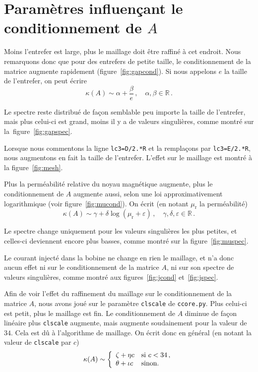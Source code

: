 \documentclass[11pt]{article}
\begin{document}
\section{Paramètres influençant le conditionnement de $A$}
\label{param}
Moins l'entrefer est large, plus le maillage doit être raffiné à cet endroit.
Nous remarquons donc que pour des entrefers de petite taille,
le conditionnement de la matrice augmente rapidement (figure~\ref{fig:gapcond}).
Si nous appelons $e$ la taille de l'entrefer, on peut écrire
\[
\kappa(A) \sim \alpha + \frac{\beta}{e}\,, \quad \alpha, \beta \in \mathbb{R}\,.
\]

Le spectre reste distribué de façon semblable peu importe la taille de l'entrefer,
mais plus celui-ci est grand, moins il y a de valeurs singulières, comme montré sur la figure~\ref{fig:gapspec}.

Lorsque nous commentons la ligne \texttt{lc3=D/2.*R} et la remplaçons par \texttt{lc3=E/2.*R}, nous augmentons en fait la taille de l'entrefer.
L'effet sur le maillage est montré à la figure~\ref{fig:mesh}.

Plus la perméabilité relative du noyau magnétique augmente,
plus le conditionnement de $A$ augmente aussi, selon une loi approximativement logarithmique (voir figure~\ref{fig:mucond}). On écrit (en notant $\mu_{\mathrm{r}}$ la perméabilité)
\[
\kappa(A) \sim \gamma + \delta \log(\mu_{\mathrm{r}} + \varepsilon)\,, \quad \gamma, \delta, \varepsilon \in \mathbb{R}\,. 
\]

Le spectre change uniquement pour les valeurs singulières les plus petites,
et celles-ci deviennent encore plus basses, comme montré sur la figure~\ref{fig:muspec}.

Le courant injecté dans la bobine ne change en rien le maillage,
et n'a donc aucun effet ni sur le conditionnement de la matrice $A$,
ni sur son spectre de valeurs singulières,
comme montré aux figures~\ref{fig:jcond} et~\ref{fig:jspec}.

Afin de voir l'effet du raffinement du maillage sur le conditionnement de la matrice $A$, nous avons joué sur le paramètre \texttt{clscale} de \texttt{ccore.py}.
Plus celui-ci est petit, plus le maillage est fin.
Le conditionnement de $A$ diminue de façon linéaire plus \texttt{clscale} augmente, mais augmente soudainement pour la valeur de $34$.
Cela est dû à l'algorithme de maillage.
On écrit donc en général (en notant la valeur de \texttt{clscale} par $c$)
\[
\kappa(A) \sim \left\{ \begin{array}{ll}
\zeta + \eta c & \textnormal{si $c < 34$}\,,\\
\theta + \iota c & \textnormal{sinon.}
\end{array}\right.
\]
\end{document}
